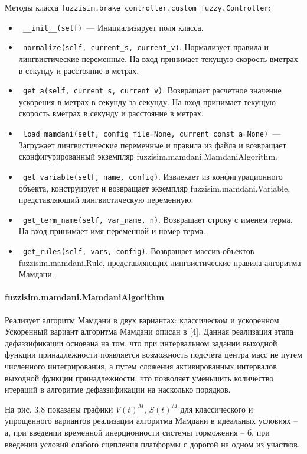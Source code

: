 Методы класса \lstinline!fuzzisim.brake_controller.custom_fuzzy.Controller!:
\begin{itemize}
	\item \lstinline! __init__(self) !— Инициализирует поля класса.
	\item \lstinline! normalize(self, current_s, current_v)!. Нормализует правила и лингвистические переменные. На вход принимает текущую скорость вметрах в секунду и расстояние в метрах.
	\item \lstinline! get_a(self, current_s, current_v)!. Возвращает расчетное значение ускорения в метрах в секунду за секунду. На вход принимает текущую скорость вметрах в секунду и расстояние в метрах.
	\item \lstinline! load_mamdani(self, config_file=None, current_const_a=None) !— Загружает лингвистические переменные и правила из файла и возвращает сконфигурированный экземпляр fuzzisim.mamdani.MamdaniAlgorithm.
	\item \lstinline! get_variable(self, name, config)!. Извлекает из конфигурационного объекта, конструирует  и возвращает экземпляр fuzzisim.mamdani.Variable, представляющий лингвистическую переменную.
	\item \lstinline! get_term_name(self, var_name, n)!.  Возвращает строку с именем терма. На вход принимает имя переменной и номер терма.
	\item \lstinline! get_rules(self, vars, config)!. Возвращает массив объектов fuzzisim.mamdani.Rule, представляющих лингвистические правила алгоритма Мамдани.
\end{itemize}

\paragraph{fuzzisim.mamdani.MamdaniAlgorithm}

Реализует алгоритм Мамдани в двух вариантах: классическом и ускоренном. Ускоренный вариант алгоритма Мамдани описан в [4]. Данная реализация этапа дефаззификации основана на том, что при интервальном задании выходной функции принадлежности появляется возможность подсчета центра масс не путем численного интегрирования, а путем сложения активированных интервалов выходной функции принадлежности, что позволяет уменьшить количество итераций в алгоритме дефаззификации на насколько порядков.

На рис. 3.8 показаны графики $V(t)^M$, $S(t)^M$ для классического и упрощенного вариантов реализации  алгоритма Мамдани в идеальных условиях – а, при введении временной инерционности системы торможения – б, при введении условий слабого сцепления платформы с дорогой на одном из участков.

